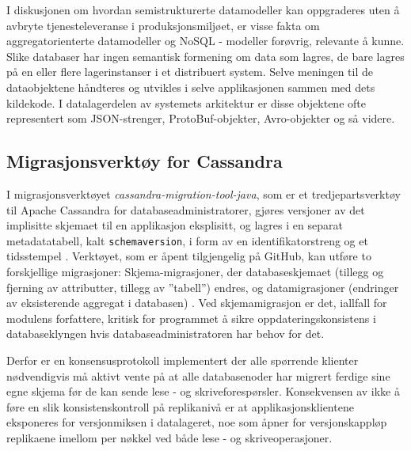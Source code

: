 I diskusjonen om hvordan semistrukturerte datamodeller kan oppgraderes uten å avbryte tjenesteleveranse i produksjonsmiljøet, er visse fakta om aggregatorienterte datamodeller og NoSQL - modeller forøvrig, relevante å kunne. Slike databaser har ingen semantisk formening om data som lagres, de bare lagres på en eller flere lagerinstanser i et distribuert system. Selve meningen til de dataobjektene håndteres og utvikles i selve applikasjonen sammen med dets kildekode. I datalagerdelen av systemets arkitektur er disse objektene ofte representert som JSON-strenger, ProtoBuf-objekter, Avro-objekter og så videre.


\subsection{Migrasjonsverktøy for Cassandra}

I migrasjonsverktøyet \emph{cassandra-migration-tool-java}, som er et tredjepartsverktøy til Apache Cassandra for databaseadministratorer, gjøres versjoner av det implisitte skjemaet til en applikasjon eksplisitt, og lagres i en separat metadatatabell, kalt \texttt{schema\textunderscore version}, i form av en identifikatorstreng og et tidsstempel \citep{bozic2015}. Verktøyet, som er åpent tilgjengelig på GitHub, kan utføre to forskjellige migrasjoner: Skjema-migrasjoner, der databaseskjemaet (tillegg og fjerning av attributter, tillegg av ''tabell'') endres, og datamigrasjoner (endringer av eksisterende aggregat i databasen) \citep{bozic2015}. Ved skjemamigrasjon er det, iallfall for modulens forfattere, kritisk for programmet å sikre oppdateringskonsistens i databaseklyngen hvis databaseadministratoren har behov for det. 

Derfor er en konsensusprotokoll implementert der alle spørrende klienter nødvendigvis må aktivt vente på at alle databasenoder har migrert ferdige sine egne skjema før de kan sende lese - og skriveforespørsler. Konsekvensen av ikke å føre en slik konsistenskontroll på replikanivå er at applikasjonsklientene eksponeres for versjonmiksen i datalageret, noe som åpner for versjonskappløp replikaene imellom per nøkkel ved både lese - og skriveoperasjoner.
